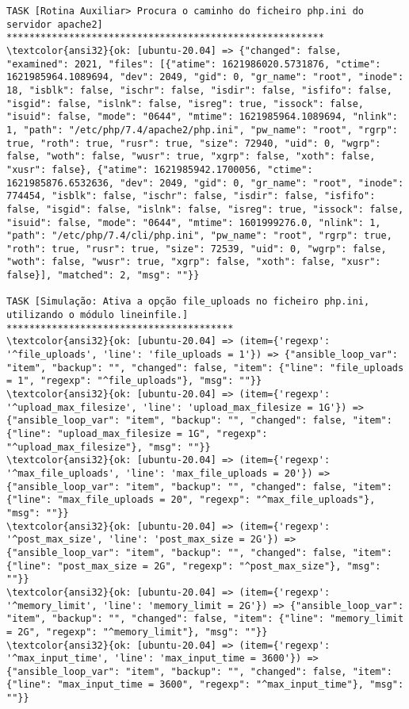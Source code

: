 \documentclass{scrartcl}
\begin{document}
\begin{Verbatim}
TASK [Rotina Auxiliar> Procura o caminho do ficheiro php.ini do servidor apache2] ********************************************************
\textcolor{ansi32}{ok: [ubuntu-20.04] => {"changed": false, "examined": 2021, "files": [{"atime": 1621986020.5731876, "ctime": 1621985964.1089694, "dev": 2049, "gid": 0, "gr_name": "root", "inode": 18, "isblk": false, "ischr": false, "isdir": false, "isfifo": false, "isgid": false, "islnk": false, "isreg": true, "issock": false, "isuid": false, "mode": "0644", "mtime": 1621985964.1089694, "nlink": 1, "path": "/etc/php/7.4/apache2/php.ini", "pw_name": "root", "rgrp": true, "roth": true, "rusr": true, "size": 72940, "uid": 0, "wgrp": false, "woth": false, "wusr": true, "xgrp": false, "xoth": false, "xusr": false}, {"atime": 1621985942.1700056, "ctime": 1621985876.6532636, "dev": 2049, "gid": 0, "gr_name": "root", "inode": 774454, "isblk": false, "ischr": false, "isdir": false, "isfifo": false, "isgid": false, "islnk": false, "isreg": true, "issock": false, "isuid": false, "mode": "0644", "mtime": 1601999276.0, "nlink": 1, "path": "/etc/php/7.4/cli/php.ini", "pw_name": "root", "rgrp": true, "roth": true, "rusr": true, "size": 72539, "uid": 0, "wgrp": false, "woth": false, "wusr": true, "xgrp": false, "xoth": false, "xusr": false}], "matched": 2, "msg": ""}}

TASK [Simulação: Ativa a opção file_uploads no ficheiro php.ini, utilizando o módulo lineinfile.] ****************************************
\textcolor{ansi32}{ok: [ubuntu-20.04] => (item={'regexp': '^file_uploads', 'line': 'file_uploads = 1'}) => {"ansible_loop_var": "item", "backup": "", "changed": false, "item": {"line": "file_uploads = 1", "regexp": "^file_uploads"}, "msg": ""}}
\textcolor{ansi32}{ok: [ubuntu-20.04] => (item={'regexp': '^upload_max_filesize', 'line': 'upload_max_filesize = 1G'}) => {"ansible_loop_var": "item", "backup": "", "changed": false, "item": {"line": "upload_max_filesize = 1G", "regexp": "^upload_max_filesize"}, "msg": ""}}
\textcolor{ansi32}{ok: [ubuntu-20.04] => (item={'regexp': '^max_file_uploads', 'line': 'max_file_uploads = 20'}) => {"ansible_loop_var": "item", "backup": "", "changed": false, "item": {"line": "max_file_uploads = 20", "regexp": "^max_file_uploads"}, "msg": ""}}
\textcolor{ansi32}{ok: [ubuntu-20.04] => (item={'regexp': '^post_max_size', 'line': 'post_max_size = 2G'}) => {"ansible_loop_var": "item", "backup": "", "changed": false, "item": {"line": "post_max_size = 2G", "regexp": "^post_max_size"}, "msg": ""}}
\textcolor{ansi32}{ok: [ubuntu-20.04] => (item={'regexp': '^memory_limit', 'line': 'memory_limit = 2G'}) => {"ansible_loop_var": "item", "backup": "", "changed": false, "item": {"line": "memory_limit = 2G", "regexp": "^memory_limit"}, "msg": ""}}
\textcolor{ansi32}{ok: [ubuntu-20.04] => (item={'regexp': '^max_input_time', 'line': 'max_input_time = 3600'}) => {"ansible_loop_var": "item", "backup": "", "changed": false, "item": {"line": "max_input_time = 3600", "regexp": "^max_input_time"}, "msg": ""}}


\end{Verbatim}
\end{document}
